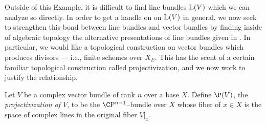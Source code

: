 Outside of this Example, it is difficult to find line bundles $\mathbb{L}(V)$ which we can analyze so directly.  In order to get a handle on on $\mathbb{L}(V)$ in general, we now seek to strengthen this bond between line bundles and vector bundles by finding inside of algebraic topology the alternative presentations of line bundles given in .  In particular, we would like a topological construction on vector bundles which produces divisors --- i.e., finite schemes over $X_E$.  This has the scent of a certain familiar topological construction called projectivization, and we now work to justify the relationship.

\begin{definition}
Let $V$ be a complex vector bundle of rank $n$ over a base $X$.  Define $\P(V)$, the \textit{projectivization of $V$}, to be the $\CP^{n-1}$--bundle over $X$ whose fiber of $x \in X$ is the space of complex lines in the original fiber $V|_x$.
\end{definition}

